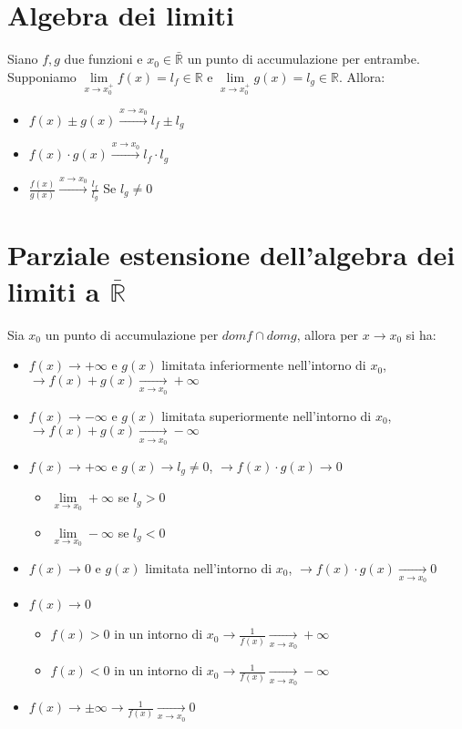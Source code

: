 \section{Algebra dei limiti}
Siano $f,g$ due funzioni e $x_0\in\bar{\mathbb{R}}$ un punto di accumulazione per entrambe. Supponiamo $\lim\limits_{x\rightarrow x_0^+}f(x)=l_f\in\mathbb{R}$ e $\lim
\limits_{x\xrightarrow{} x_0^+}g(x)=l_g\in\mathbb{R}$. Allora:
\begin{itemize}
\item $f(x)\pm g(x)\xrightarrow{x\rightarrow x_0} l_f\pm l_g$
\item $f(x) \cdot g(x)\xrightarrow{x\rightarrow x_0} l_f\cdot l_g$
\item $\frac{f(x)}{g(x)}\xrightarrow{x\rightarrow x_0}\frac{l_f}{l_g}$ Se $l_g\neq 0$
\end{itemize}
\section{Parziale estensione dell'algebra dei limiti a $\bar{\mathbb{R}}$}
Sia $x_0$ un punto di accumulazione per $domf\cap domg$, allora per $x\rightarrow x_0$ si ha:
\begin{itemize}
\item $f(x)\rightarrow+\infty$ e $g(x)$ limitata inferiormente nell'intorno di $x_0$, $\rightarrow f(x)+g(x)\xrightarrow[x\rightarrow x_0]{}+\infty$
\item $f(x)\rightarrow-\infty$ e $g(x)$ limitata superiormente nell'intorno di $x_0$, $\rightarrow f(x)+g(x)\xrightarrow[x\rightarrow x_0]{}-\infty$
\item $f(x)\rightarrow+\infty$ e $g(x)\rightarrow l_g\neq 0$, $\rightarrow f(x)\cdot g(x)\rightarrow 0$
\begin{itemize}
\item $\lim\limits_{x\rightarrow x_0}+\infty$ se $l_g>0$
\item $\lim\limits_{x\rightarrow x_0}-\infty$ se $l_g<0$
\end{itemize}
\item $f(x)\rightarrow 0$ e $g(x)$ limitata nell'intorno di $x_0$, $\rightarrow f(x)\cdot g(x)\xrightarrow[x\rightarrow x_0]{} 0$
\item $f(x)\rightarrow 0$
\begin{itemize}
\item $f(x)>0$ in un intorno di $x_0\rightarrow \frac{1}{f(x)}\xrightarrow[x\rightarrow x_0]{}+\infty$ 
\item $f(x)<0$ in un intorno di $x_0\rightarrow \frac{1}{f(x)}\xrightarrow[x\rightarrow x_0]{}-\infty$
\end{itemize}
\item $f(x)\rightarrow\pm\infty\rightarrow \frac{1}{f(x)}\xrightarrow[x\rightarrow x_0]{} 0 $
\end{itemize}
